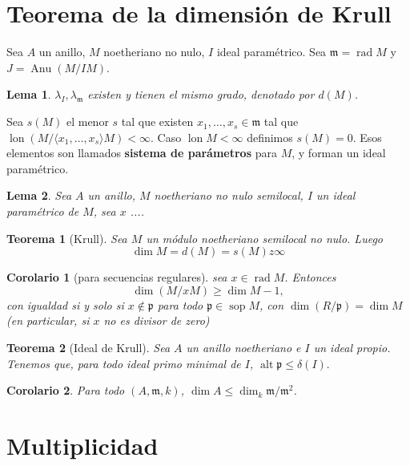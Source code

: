 \documentclass[12pt]{book}
\newtheorem{teo}{Teorema}
\newtheorem{lem}{Lema}
\newtheorem{cor}{Corolario}
\newcommand{\pp}{\mathfrak{p}}
\newcommand{\sop}{\operatorname{sop}}
\newcommand{\lon}{\operatorname{lon}}
\newcommand{\mm}{\mathfrak{m}}
\begin{document}
\section{Teorema de la dimensión de Krull}

Sea $A$ un anillo, $M$ noetheriano no nulo, $I$ ideal paramétrico. Sea $\mm = \operatorname{rad} M $ y $J= \operatorname{Anu} (M / IM )$.

\begin{lem}
$\lambda_I , \lambda_\mm$ existen y tienen el mismo grado, denotado por $d(M)$.
\end{lem}

Sea $s(M)$ el menor $s$ tal que existen $x_1, \ldots, x_s\in \mm$ tal que $\lon (M / \langle x_1, \ldots, x_s \rangle  M) < \infty.$ Caso $\lon M < \infty$ definimos $s(M)=0$. Esos elementos son llamados \textbf{sistema de parámetros} para $M$, y forman un ideal paramétrico.

\begin{lem}
Sea $A$ un anillo, $M$ noetheriano no nulo semilocal, $I$ un ideal paramétrico de $M$, sea $x$ ....
\end{lem} 





\begin{teo}[Krull]
	Sea $M$ un módulo noetheriano semilocal no nulo. Luego $$ \dim M = d (M) = s(M) z \infty $$
\end{teo}

\begin{cor}[para secuencias regulares]
sea $x \in \operatorname{rad} M$. Entonces $$\dim (M/xM)\geq \dim M -1,$$ con igualdad si y solo si $x \notin \pp$ para todo $\pp \in \sop M$, con $\dim (R/\pp) = \dim M$ (en particular, si $x$ no es divisor de zero)
\end{cor}

\begin{teo}[Ideal de Krull]
	Sea $A$ un anillo noetheriano e $I$ un ideal propio. Tenemos que, para todo ideal primo minimal de $I$, $\operatorname{alt}\mathfrak{p} \leq \delta(I).$
\end{teo}

\begin{cor}
	Para todo $(A, \mathfrak{m}, k)$, $\dim A \leq \dim_k \mathfrak{m} / \mathfrak{m}^2 $.
\end{cor}


\section{Multiplicidad}
\end{document}
